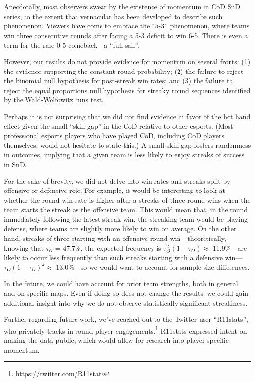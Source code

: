 \documentclass{article}
\begin{document}
Anecdotally, most observers swear by the existence of momentum in CoD
SnD series, to the extent that vernacular has been developed to describe
such phenomenon. Viewers have come to embrace the ``5-3'' phenomenon,
where teams win three consecutive rounds after facing a 5-3 deficit to
win 6-5. There is even a term for the rare 0-5 comeback---a ``full
sail''.

However, our results do not provide evidence for momentum on several
fronts: (1) the evidence supporting the constant round probability; (2)
the failure to reject the binomial null hypothesis for post-streak win
rates; and (3) the failure to reject the equal proportions null
hypothesis for streaky round sequences identified by the Wald-Wolfowitz
runs test.

Perhaps it is not surprising that we did not find evidence in favor of
the hot hand effect given the small ``skill gap'' in the CoD relative to
other esports. (Most professional esports players who have played CoD,
including CoD players themselves, would not hesitate to state this.) A
small skill gap fosters randomness in outcomes, implying that a given
team is less likely to enjoy streaks of success in SnD.

For the sake of brevity, we did not delve into win rates and streaks
split by offensive or defensive role. For example, it would be
interesting to look at whether the round win rate is higher after a
streaks of three round wins when the team starts the streak as the
offensive team. This would mean that, in the round immediately following
the latest streak win, the streaking team would be playing defense,
where teams are slightly more likely to win on average. On the other
hand, streaks of three starting with an offensive round
win---theoretically, knowing that \(\tau_O\) = 47.7\%, the expected
frequency is \(\tau_O^2 (1 - \tau_O) \approx\) 11.9\%---are likely to
occur less frequently than such streaks starting with a defensive
win---\(\tau_O (1 - \tau_O)^2 \approx\) 13.0\%---so we would want to
account for sample size differences.

In the future, we could have account for prior team strengths, both in
general and on specific maps. Even if doing so does not change the
results, we could gain additional insight into why we do not observe
statistically significant streakiness.

Further regarding future work, we've reached out to the Twitter user
``R11stats'', who privately tracks in-round player
engagements.\footnote{\url{https://twitter.com/R11stats}} R11stats
expressed intent on making the data public, which would allow for
research into player-specific momentum.
\end{document}
